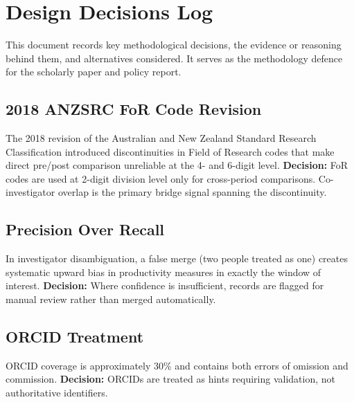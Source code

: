 \section{Design Decisions Log}
\label{sec:decisions}

This document records key methodological decisions, the evidence or reasoning
behind them, and alternatives considered. It serves as the methodology
defence for the scholarly paper and policy report.

\subsection{2018 ANZSRC FoR Code Revision}
The 2018 revision of the Australian and New Zealand Standard Research
Classification introduced discontinuities in Field of Research codes that
make direct pre/post comparison unreliable at the 4- and 6-digit level.
\textbf{Decision:} FoR codes are used at 2-digit division level only for
cross-period comparisons. Co-investigator overlap is the primary bridge
signal spanning the discontinuity.

\subsection{Precision Over Recall}
In investigator disambiguation, a false merge (two people treated as one)
creates systematic upward bias in productivity measures in exactly the
window of interest. \textbf{Decision:} Where confidence is insufficient,
records are flagged for manual review rather than merged automatically.

\subsection{ORCID Treatment}
ORCID coverage is approximately 30\% and contains both errors of omission
and commission. \textbf{Decision:} ORCIDs are treated as hints requiring
validation, not authoritative identifiers.